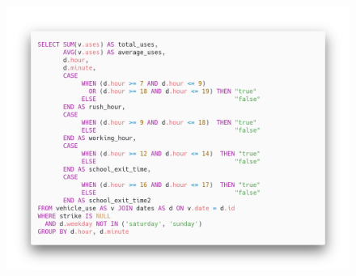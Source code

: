 \begin{figure}[H]                                                                                                                                                            
\centering                                                                                                                                                                   
\includegraphics[width=\textwidth]{images/query6}                                                                                                                                   
\label{fig:query6}                                                                                                                                                           
\end{figure}

